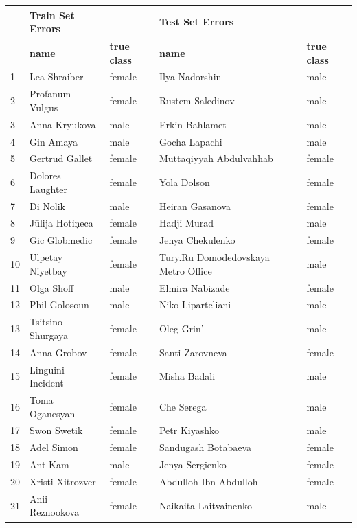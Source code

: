 \documentclass[runningheads,a4paper]{llncs}
\begin{document}
\begin{table}[h]

\footnotesize

\begin{center}
\begin{tabular}{|l|ll|ll|}
\hline
 &  \bf Train Set Errors &  & \bf Test Set Errors & \\ \hline 

 &  \bf name & \bf true class & \bf name & \bf true class \\ \hline \hline

1 & Lea Shraiber  & female & Ilya Nadorshin & male \\  
2 & Profanum Vulgus  & female & Rustem Saledinov & male \\  
3 & Anna Kryukova & male & Erkin Bahlamet & male \\  
4 & Gin Amaya & male & Gocha Lapachi & male \\  
5 & Gertrud Gallet  & female & Muttaqiyyah Abdulvahhab & female \\  
6 & Dolores Laughter & female & Yola Dolson & female \\  
7 & Di Nolik  & male & Heiran Gasanova & female \\  
8 & Jūlija Hotiņeca  & female & Hadji Murad & male \\  
9 & Gic Globmedic  & female & Jenya Chekulenko & female \\  
10 & Ulpetay Niyetbay  & female & Tury.Ru Domodedovskaya Metro Office & male \\  
11 & Olga Shoff  & male & Elmira Nabizade & female \\  
12 & Phil Golosoun  & male & Niko Liparteliani & male \\  
13 & Tsitsino Shurgaya & female & Oleg Grin' & male \\  
14 & Anna Grobov  & female & Santi Zarovneva & female \\  
15 & Linguini Incident & female & Misha Badali & male \\  
16 & Toma Oganesyan & female & Che Serega & male \\  
17 & Swon Swetik & female & Petr Kiyashko & male \\  
18 & Adel Simon & female & Sandugash Botabaeva & female \\  
19 & Ant Kam-  & male & Jenya Sergienko & female \\  
20 & Xristi Xitrozver  & female & Abdulloh Ibn Abdulloh & female \\  
21 & Anii Reznookova  & female & Naikaita Laitvainenko & male \\  

\end{tabular}
\end{center}
\end{table}
\end{document}
